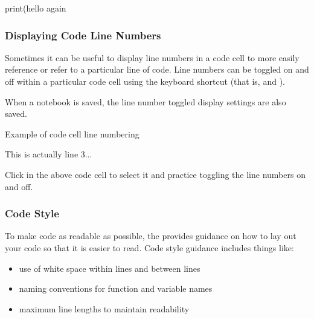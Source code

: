 \documentclass[letterpaper,10pt,english]{sphinxmanual}
\begin{document}
{
\begin{sphinxVerbatim}[commandchars=\\\{\}]
\llap{\color{nbsphinxin}[ ]:\,\hspace{\fboxrule}\hspace{\fboxsep}}print(\PYGZdq{}hello again\PYGZdq{}
\end{sphinxVerbatim}
}


\subsubsection{Displaying Code Line Numbers}
\label{\detokenize{content/00_READ_ME_FIRST/Section_00_06_RoboLab_Environment:Displaying-Code-Line-Numbers}}
Sometimes it can be useful to display line numbers in a code cell to more easily reference or refer to a particular line of code. Line numbers can be toggled on and off within a particular code cell using the keyboard shortcut  (that is,  and ).

When a notebook is saved, the line number toggled display settings are also saved.

{
\begin{sphinxVerbatim}[commandchars=\\\{\}]
\llap{\color{nbsphinxin}[ ]:\,\hspace{\fboxrule}\hspace{\fboxsep}}\PYGZsh{} Example of code cell line numbering

\PYGZsh{} This is actually line 3...
\end{sphinxVerbatim}
}

Click in the above code cell to select it and practice toggling the line numbers on and off.


\subsubsection{Code Style}
\label{\detokenize{content/00_READ_ME_FIRST/Section_00_06_RoboLab_Environment:Code-Style}}
To make code as readable as possible, the  provides guidance on how to lay out your code so that it is easier to read. Code style guidance includes things like:
\begin{itemize}
\item {} 
use of white space within lines and between lines

\item {} 
naming conventions for function and variable names

\item {} 
maximum line lengths to maintain readability

\end{itemize}
\end{document}
